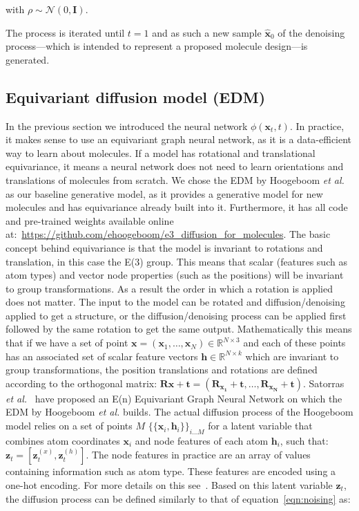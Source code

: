\documentclass[journal=jacsat,manuscript=article]{achemso}
\begin{document}
with $\rho\sim\mathcal{N}(0,\mathbf{I})$.

The process is iterated until $t=1$ and as such a new sample $\mathbf{\hat{x}}_0$ of the denoising process---which is intended to represent a proposed molecule design---is generated. 

\subsection*{Equivariant diffusion model (EDM)}
In the previous section we introduced the neural network $\phi(\mathbf{x}_t,t)$. In practice, it makes sense to use an equivariant graph neural network, as it is a data-efficient way to learn about molecules. If a model has rotational and translational equivariance, it means a neural network does not need to learn orientations and translations of molecules from scratch. We chose the EDM by Hoogeboom \textit{et al.}~\cite{hoogeboom2022equivariant} as our baseline generative model, as it provides a generative model for new molecules and has equivariance already built into it. Furthermore, it has all code and pre-trained weights available online at:~\url{https://github.com/ehoogeboom/e3_diffusion_for_molecules}. The basic concept behind equivariance is that the model is invariant to rotations and translation, in this case the E(3) group. This means that scalar (features such as atom types) and vector node properties (such as the positions) will be invariant to group transformations. As a result the order in which a rotation is applied does not matter. The input to the model can be rotated and diffusion/denoising  applied to get a structure, or the diffusion/denoising process can be applied first followed by the same rotation to get the same output. 
Mathematically this means that if we have a set of point $\mathbf{x} = (\mathbf{x}_1,\ldots,\mathbf{x}_N) \in \mathbb{R}^{N\times 3}$ and each of these points has an associated set of scalar feature vectors $\mathbf{h}\in \mathbb{R}^{N\times k}$ which are invariant to group transformations, the position translations and rotations are defined according to the orthogonal matrix: $\mathbf{Rx + t} = (\mathbf{R_{x_1}+t},\ldots, \mathbf{R_{x_N}+t})$. Satorras \textit{et al.}~\cite{satorras2022equivariant} have proposed an E(n) Equivariant Graph Neural Network on which the EDM by Hoogeboom \textit{et al.} builds. 
The actual diffusion process of the Hoogeboom model relies on a set of points $M$ $\{\{\mathbf{x}_i,\mathbf{h}_i\}\}_{i\ldots M}$ for a latent variable that combines atom coordinates $\mathbf{x}_i$ and node features of each atom $\mathbf{h}_i$, such that: $\mathbf{z}_t = [\mathbf{z}_t^{(x)}, \mathbf{z}_t^{(h)}]$. The node features in practice are an array of values containing information such as atom type. These features are encoded using a one-hot encoding. For more details on this see~\cite{hoogeboom2022equivariant}. Based on this latent variable $\mathbf{z}_t$, the diffusion process can be defined similarly to that of equation~\ref{eqn:noising} as:
\end{document}
